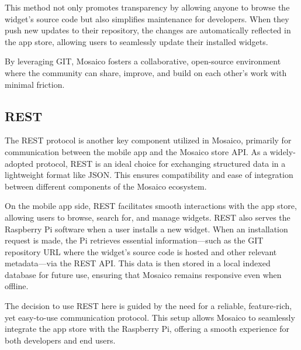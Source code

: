 This method not only promotes transparency by allowing anyone to browse the widget’s source code but also simplifies maintenance for developers. When they push new updates to their repository, the changes are automatically reflected in the app store, allowing users to seamlessly update their installed widgets.

By leveraging GIT, Mosaico fosters a collaborative, open-source environment where the community can share, improve, and build on each other’s work with minimal friction.

\subsection{REST}

The REST protocol is another key component utilized in Mosaico, primarily for communication between the mobile app and the Mosaico store API. As a widely-adopted protocol, REST is an ideal choice for exchanging structured data in a lightweight format like JSON. This ensures compatibility and ease of integration between different components of the Mosaico ecosystem.

On the mobile app side, REST facilitates smooth interactions with the app store, allowing users to browse, search for, and manage widgets. REST also serves the Raspberry Pi software when a user installs a new widget. When an installation request is made, the Pi retrieves essential information—such as the GIT repository URL where the widget’s source code is hosted and other relevant metadata—via the REST API. This data is then stored in a local indexed database for future use, ensuring that Mosaico remains responsive even when offline.

The decision to use REST here is guided by the need for a reliable, feature-rich, yet easy-to-use communication protocol. This setup allows Mosaico to seamlessly integrate the app store with the Raspberry Pi, offering a smooth experience for both developers and end users.